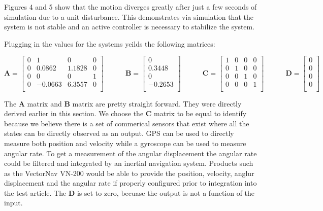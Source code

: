\documentclass[titlepage]{article}
\begin{document}
Figures 4 and 5 show that the motion diverges greatly after just a few seconds of simulation due to a unit disturbance. This demonstrates via simulation that the system is not stable and an active controller is necessary to stabilize the system.

Plugging in the values for the systems yeilds the following matrices:

\begin{equation}
	\textbf{A} = \begin{bmatrix}
		0 & 1 & 0 & 0\\
		0 & 0.0862 & 1.1828 & 0\\
		0 & 0 & 0 & 1\\
		0 & -0.0663 & 6.3557 & 0\\
		\end{bmatrix}
	\quad\quad\quad
	\textbf{B} = \begin{bmatrix}
		0 \\
		0.3448 \\
		0 \\
		-0.2653 \\
		\end{bmatrix}
	\quad\quad\quad
	\textbf{C} = \begin{bmatrix}
		1 & 0 & 0 & 0\\
		0 & 1 & 0 & 0\\
		0 & 0 & 1 & 0\\
		0 & 0 & 0 & 1\\
		\end{bmatrix}
	\quad\quad\quad
	\textbf{D} = \begin{bmatrix}
	0\\
	0\\
	0\\
	0\\
	\end{bmatrix}
\end{equation}

The \textbf{A} matrix and \textbf{B} matrix are pretty straight forward. They were directly derived earlier in this section. We choose the \textbf{C} matrix to be equal to identify because we believe there is a set of commerical sensors that exist where all the states can be directly observed as an output. GPS can be used to directly measure both position and velocity while a gyroscope can be used to measure angular rate. To get a measurement of the angular displacement the angular rate could be filtered and integrated by an inertial navigation system. Products such as the VectorNav VN-200 would be able to provide the position, velocity, anglur displacement and the angular rate if properly configured prior to integration into the test article. The \textbf{D} is set to zero, becuase the output is not a function of the input.
\end{document}
